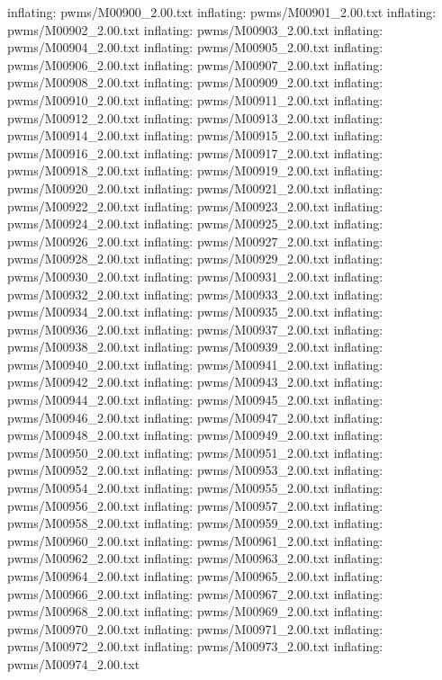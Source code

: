 \documentclass[letterpaper,10pt,english]{sphinxmanual}
\begin{document}
{\begin{sphinxVerbatim}[commandchars=\\\{\}]
  inflating: pwms/M00900\_2.00.txt
  inflating: pwms/M00901\_2.00.txt
  inflating: pwms/M00902\_2.00.txt
  inflating: pwms/M00903\_2.00.txt
  inflating: pwms/M00904\_2.00.txt
  inflating: pwms/M00905\_2.00.txt
  inflating: pwms/M00906\_2.00.txt
  inflating: pwms/M00907\_2.00.txt
  inflating: pwms/M00908\_2.00.txt
  inflating: pwms/M00909\_2.00.txt
  inflating: pwms/M00910\_2.00.txt
  inflating: pwms/M00911\_2.00.txt
  inflating: pwms/M00912\_2.00.txt
  inflating: pwms/M00913\_2.00.txt
  inflating: pwms/M00914\_2.00.txt
  inflating: pwms/M00915\_2.00.txt
  inflating: pwms/M00916\_2.00.txt
  inflating: pwms/M00917\_2.00.txt
  inflating: pwms/M00918\_2.00.txt
  inflating: pwms/M00919\_2.00.txt
  inflating: pwms/M00920\_2.00.txt
  inflating: pwms/M00921\_2.00.txt
  inflating: pwms/M00922\_2.00.txt
  inflating: pwms/M00923\_2.00.txt
  inflating: pwms/M00924\_2.00.txt
  inflating: pwms/M00925\_2.00.txt
  inflating: pwms/M00926\_2.00.txt
  inflating: pwms/M00927\_2.00.txt
  inflating: pwms/M00928\_2.00.txt
  inflating: pwms/M00929\_2.00.txt
  inflating: pwms/M00930\_2.00.txt
  inflating: pwms/M00931\_2.00.txt
  inflating: pwms/M00932\_2.00.txt
  inflating: pwms/M00933\_2.00.txt
  inflating: pwms/M00934\_2.00.txt
  inflating: pwms/M00935\_2.00.txt
  inflating: pwms/M00936\_2.00.txt
  inflating: pwms/M00937\_2.00.txt
  inflating: pwms/M00938\_2.00.txt
  inflating: pwms/M00939\_2.00.txt
  inflating: pwms/M00940\_2.00.txt
  inflating: pwms/M00941\_2.00.txt
  inflating: pwms/M00942\_2.00.txt
  inflating: pwms/M00943\_2.00.txt
  inflating: pwms/M00944\_2.00.txt
  inflating: pwms/M00945\_2.00.txt
  inflating: pwms/M00946\_2.00.txt
  inflating: pwms/M00947\_2.00.txt
  inflating: pwms/M00948\_2.00.txt
  inflating: pwms/M00949\_2.00.txt
  inflating: pwms/M00950\_2.00.txt
  inflating: pwms/M00951\_2.00.txt
  inflating: pwms/M00952\_2.00.txt
  inflating: pwms/M00953\_2.00.txt
  inflating: pwms/M00954\_2.00.txt
  inflating: pwms/M00955\_2.00.txt
  inflating: pwms/M00956\_2.00.txt
  inflating: pwms/M00957\_2.00.txt
  inflating: pwms/M00958\_2.00.txt
  inflating: pwms/M00959\_2.00.txt
  inflating: pwms/M00960\_2.00.txt
  inflating: pwms/M00961\_2.00.txt
  inflating: pwms/M00962\_2.00.txt
  inflating: pwms/M00963\_2.00.txt
  inflating: pwms/M00964\_2.00.txt
  inflating: pwms/M00965\_2.00.txt
  inflating: pwms/M00966\_2.00.txt
  inflating: pwms/M00967\_2.00.txt
  inflating: pwms/M00968\_2.00.txt
  inflating: pwms/M00969\_2.00.txt
  inflating: pwms/M00970\_2.00.txt
  inflating: pwms/M00971\_2.00.txt
  inflating: pwms/M00972\_2.00.txt
  inflating: pwms/M00973\_2.00.txt
  inflating: pwms/M00974\_2.00.txt

\end{sphinxVerbatim}}
\end{document}
